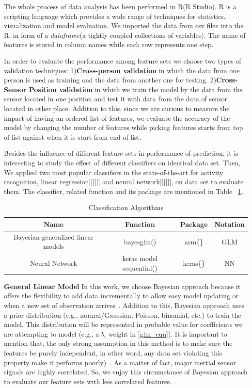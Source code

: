 The whole process of data analysis has been performed in R(R Studio). R is a scripting language which provides a wide range of techniques for statistics, visualization and model evaluation. We imported the data from csv files into the R, in form of a \textit{dataframe}(a tightly coupled collections of variables). The name of features is stored in column names while each row represents one step.

In order to evaluate the performance among feature sets we choose two types of validation techniques: 1)\textbf{Cross-person validation} in which the data from one person is used as training and the data from another one for testing. 2)\textbf{Cross-Sensor Position validation} in which we train the model by the data from the sensor located in one position and test it with data from the data of sensor located in other place. Addition to this, since we are curious to measure the impact of having an ordered list of features, we evaluate the accuracy of the model by changing the number of features while picking features starts from top of list against when it is start from end of list.

Besides the influence of different feature sets in performance of prediction, it is interesting to study the effect of different classifiers on identical data set.
Then, We applied two most popular classifiers in the state-of-the-art for activity recognition, linear regression[][][] and neural network[][][], on data set to evaluate them. The classifier, related function and its package are mentioned in Table ~\ref{classification_algorithm}.

\begin{table}
  \caption{Classification Algorithms}
  \label{classification_algorithm}
  \begin{tabular}{ |c | c | c | c | }
    \hline
    Name&Function&Package&Notation\\
    \hline
    Bayesian generalized linear models &   bayesglm() &arm\{\}& GLM\\
    \hline
    Neural Network &  keras model sequential() &keras\{\}&NN\\
  \hline
\end{tabular}
\end{table}
\textbf{General Linear Model}
 In this work, we choose Bayesian approach because it offers the flexibility to add data incrementally to allow easy model updating or when a new set of observation arrives~\cite{ramasubramanian2016machine}. Addition to this, Bayesian approach uses a prior distribution (e.g., normal/Gaussian, Poisson, binomial, etc.) to train the model. This distribution will be represented in probable value for coefficients we are attempting to model (e.g., a $b_i$ weight in \ref{glm_equ}). It is important to mention that, the only strong assumption in this method is to make sure the features be purely independent, in other word, any data set violating this property make it performs poorly)~\cite{ramasubramanian2016machine}. As a matter of fact, major inertial sensor signals are highly correlated, So, we enjoy this circumstance of Bayesian approach to evaluate our feature sets with less correlated features.

